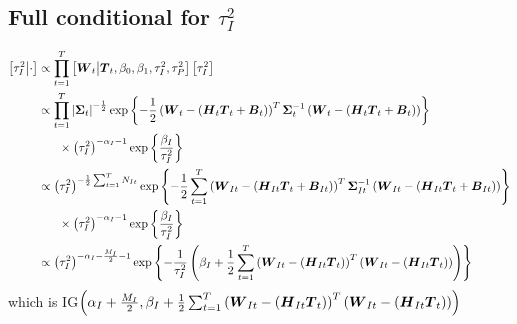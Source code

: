 \documentclass{article}\usepackage[]{graphicx}\usepackage[]{color}
\def\bm#1{\mbox{\boldmath $#1$}}
\begin{document}
\subsection{Full conditional for $\tau^2_I$}
%
\begin{align*}
%
\left[ \tau^2_I \middle| \cdot \right] & \propto \prod_{t = 1}^T \left[ \bm{W}_t \middle| \bm{T}_t, \beta_0, \beta_1, \tau^2_I, \tau^2_P \right] \left[ \tau^2_I \right] \\
%
& \propto \prod_{t = 1}^T \left| \bm{\Sigma}_t \right|^{ - \frac{1} {2}} \exp{ \left\{ - \frac{1} {2} \left( \bm{W}_t - \left( \bm{H}_t \bm{T}_t + \bm{B}_t \right) \right)^T \bm{\Sigma}_t^{ - 1} \left( \bm{W}_t - \left( \bm{H}_t \bm{T}_t + \bm{B}_t \right) \right) \right\} }\\
& \hspace{6mm} \times \left( \tau^2_I \right)^{ - \alpha_I - 1 } \exp{ \left\{ \frac{\beta_I} {\tau^2_I} \right\} }\\
%
& \propto \left( \tau^2_I \right)^{ - \frac{1} {2} \sum_{t = 1}^T N_{It}} \exp{ \left\{ - \frac{1} {2} \sum_{t = 1}^T \left( \bm{W}_{It} - \left( \bm{H}_{It} \bm{T}_t + \bm{B}_{It} \right) \right)^T \bm{\Sigma}_{It}^{ - 1} \left( \bm{W}_{It} - \left( \bm{H}_{It} \bm{T}_t + \bm{B}_{It} \right) \right) \right\} }\\
& \hspace{6mm} \times \left( \tau^2_I \right)^{ - \alpha_I - 1 } \exp{ \left\{ \frac{\beta_I} {\tau^2_I} \right\} }\\
%
& \propto \left( \tau^2_I \right)^{ - \alpha_I - \frac{M_I} {2} - 1 } \exp{ \left\{ - \frac{1} {\tau^2_I} \left( \beta_I + \frac{1} {2} \sum_{t = 1}^T \left( \bm{W}_{It} - \left( \bm{H}_{It} \bm{T}_t \right) \right)^T \left( \bm{W}_{It} - \left( \bm{H}_{It} \bm{T}_t \right) \right) \right) \right\} }\\
%
\end{align*}
%
which is IG$\left( \alpha_I + \frac{M_I} {2}, \beta_I + \frac{1} {2} \sum_{t = 1}^T \left( \bm{W}_{It} - \left( \bm{H}_{It} \bm{T}_t \right) \right)^T \left( \bm{W}_{It} - \left( \bm{H}_{It} \bm{T}_t \right) \right) \right)$
%
%
\end{document}

